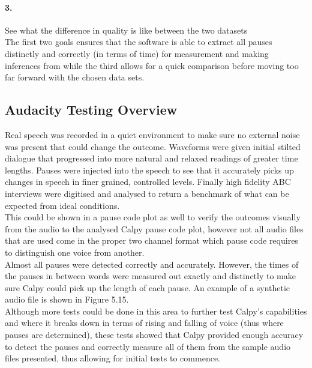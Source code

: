 \paragraph{3.} See what the difference in quality is like between the two datasets \\

The first two goals ensures that the software is able to extract all pauses distinctly and correctly (in terms of time) for measurement and making inferences from while the third allows for a quick comparison before moving too far forward with the chosen data sets. \\

\subsection{Audacity Testing Overview} 
Real speech was recorded in a quiet environment to make sure no external 
noise was present that could change the outcome. Waveforms were given initial 
stilted dialogue that progressed into more natural and 
relaxed readings of greater time lengths. Pauses were injected into the speech to see that
 it accurately picks up changes in speech in finer grained, controlled levels. 
Finally high fidelity ABC interviews were digitised and analysed to return a benchmark 
of what can be expected from ideal conditions. \\ 

This could be shown in a pause code plot as well to verify the outcomes visually from the 
audio to the analysed Calpy pause code plot, however not all audio files that are used come
in the proper two channel format which pause code requires to distinguish one voice from another.  \\

Almost all pauses were detected correctly and accurately. 
However, the times of the pauses in between words were measured out exactly and distinctly to make 
sure Calpy could pick up the length of each pause. An example of a synthetic audio file is shown in Figure 5.15. \\

Although more tests could be done in this area to further test Calpy's capabilities and 
where it breaks down in terms of rising and falling of voice (thus where pauses are 
determined), these tests showed that Calpy provided enough accuracy to detect the pauses 
and correctly measure all of them from the sample audio files presented, thus allowing for initial tests to commence. \\

